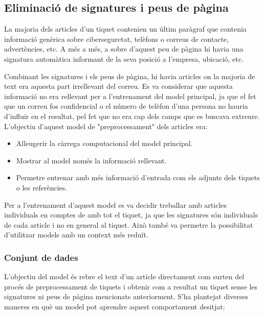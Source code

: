 \subsection{Eliminació de signatures i peus de pàgina}
La majoria dels articles d'un tiquet contenien un últim paràgraf que contenia informació genèrica sobre ciberseguretat, telèfons o correus de contacte, advertències, etc. A més a més, a sobre d'aquest peu de pàgina hi havia una signatura automàtica informant de la seva posició a l'empresa, ubicació, etc. 

Combinant les signatures i els peus de pàgina, hi havia articles on la majoria de text era aquesta part irrellevant del correu. Es va considerar que aquesta informació no era rellevant per a l'entrenament del model principal, ja que el fet que un correu fos confidencial o el número de telèfon d'una persona no hauria d'influir en el resultat, pel fet que no era cap dels camps que es buscava extreure. L'objectiu d'aquest model de "preprocessament" dels articles era:

\begin{itemize}
     \item Alleugerir la càrrega computacional del model principal.
     \item Mostrar al model només la informació rellevant.
     \item Permetre entrenar amb més informació d'entrada com els adjunts dels tiquets o les referències.
\end{itemize}

Per a l'entrenament d'aquest model es va decidir treballar amb articles individuals en comptes de amb tot el tiquet, ja que les signatures són individuals de cada article i no en general al tiquet. Això també va permetre la possibilitat d'utilitzar models amb un context més reduït.

\subsubsection{Conjunt de dades}
L'objectiu del model és rebre el text d'un article directament com surten del procés de preprocessament de tiquets i obtenir com a resultat un tiquet sense les signatures ni peus de pàgina mencionats anteriorment. S'ha plantejat diverses maneres en què un model pot aprendre aquest comportament desitjat:

